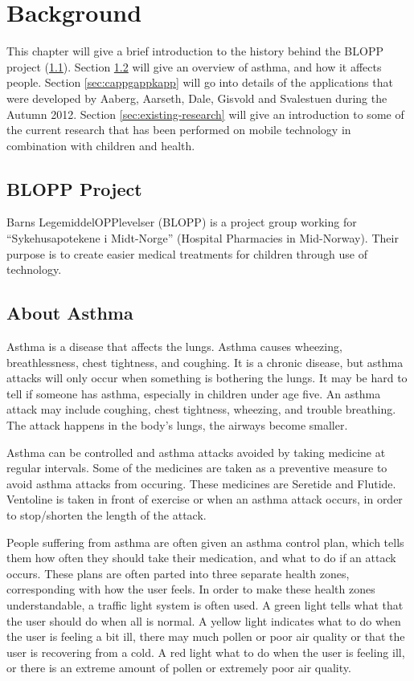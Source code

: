 \chapter{Background}
\label{chp:background}


This chapter will give a brief introduction to the history behind the BLOPP project (\ref{sec:bloppproject}). Section \ref{sec:about-asthma} will give an overview of asthma, and how it affects people. Section \ref{sec:cappgappkapp} will go into details of the applications that were developed by Aaberg, Aarseth, Dale, Gisvold and Svalestuen during the Autumn 2012.     
Section \ref{sec:existing-research} will give an introduction to some of the current research that has been performed on mobile technology in combination with children and health.   


\section{BLOPP Project}
\label{sec:bloppproject}
Barns LegemiddelOPPlevelser (BLOPP) is a project group working for ``Sykehusapotekene i Midt-Norge'' (Hospital Pharmacies in Mid-Norway). Their purpose is to create easier medical treatments for children through use of technology.

\section{About Asthma}
\label{sec:about-asthma}
Asthma is a disease that affects the lungs. Asthma causes wheezing, breathlessness, chest tightness, and coughing. It is a chronic disease, but asthma attacks will only occur when something is bothering the lungs. It may be hard to tell if someone has asthma, especially in children under age five. 
An asthma attack may include coughing, chest tightness, wheezing, and trouble breathing. The attack happens in the body's lungs, the airways become smaller.

Asthma can be controlled and asthma attacks avoided by taking medicine at regular intervals. Some of the medicines are taken as a preventive measure to avoid asthma attacks from occuring. These medicines are Seretide and Flutide. Ventoline is taken in front of exercise or when an asthma attack occurs, in order to stop/shorten the length of the attack. 

People suffering from asthma are often given an asthma control plan, which tells them how often they should take their medication, and what to do if an attack occurs. These plans are often parted into three separate health zones, corresponding with how the user feels. In order to make these health zones understandable, a traffic light system is often used. A green light tells what that the user should do when all is normal. A yellow light indicates what to do when the user is feeling a bit ill, there may much pollen or poor air quality or that the user is recovering from a cold. A red light what to do when the user is feeling ill, or there is an extreme amount of pollen or extremely poor air quality.  


